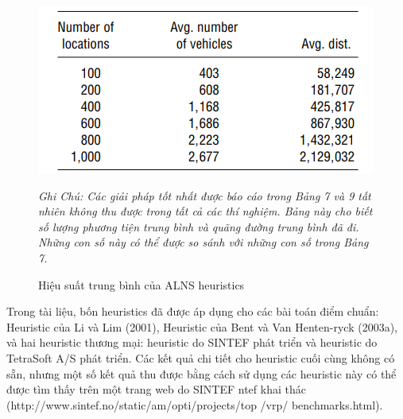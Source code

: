 

\begin{center}
    \begin{figure}[htp]
    \caption{Hiệu suất trung bình của ALNS heuristics}        
    \begin{center}
     \includegraphics[scale=.7]{figures/Thuy_table10}
    \end{center}
  \textit{Ghi Chú: Các giải pháp tốt nhất được báo cáo trong Bảng 7 và 9 tất nhiên không thu được trong tất cả các thí nghiệm. Bảng này cho biết số lượng phương tiện trung bình và quãng đường trung bình đã đi. Những con số này có thể được so sánh với những con số trong Bảng 7.}
    \end{figure}
\end{center}

Trong tài liệu, bốn heuristics đã được áp dụng cho các bài toán điểm chuẩn: Heuristic của Li và Lim (2001), Heuristic của Bent và Van Henten-ryck (2003a), và hai heuristic thương mại: heuristic do SINTEF phát triển và heuristic do TetraSoft A/S phát triển. Các kết quả chi tiết cho heuristic cuối cùng không có sẵn, nhưng một số kết quả thu được bằng cách sử dụng các heuristic này có thể được tìm thấy trên một trang web do SINTEF ntef khai thác (http://www.sintef.no/static/am/opti/projects/top /vrp/ benchmarks.html).

